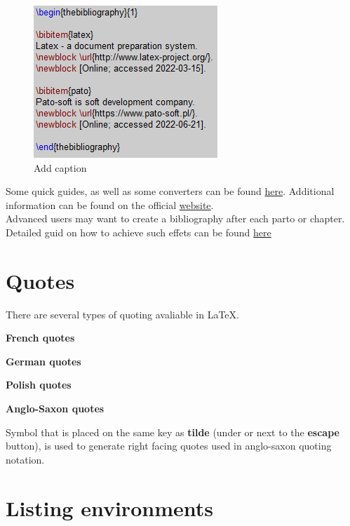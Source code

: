 \begin{figure}[H]
\centering
\includegraphics[scale=0.9]{content/LaTeX/figures/biblio_bbl.png}
\caption{Add caption}
\label{fig:printglossary} %
\end{figure}

Some quick guides, as well as some converters can be found \href{https://www.bibtex.com/g/bibtex-format/}{here}. Additional information can be found on the official \href{https://tug.org/bibtex/}{website}.\\

Advanced users may want to create a bibliography after each parto or chapter. Detailed guid on how to achieve such effets can be found \href{https://tex.stackexchange.com/questions/229846/different-bibliographies-for-each-chapter-with-shared-references}{here}

\section{Quotes}

There are several types of quoting avaliable in \LaTeX.

\textbf{French quotes}

\textbf{German quotes}

\textbf{Polish quotes}

\textbf{Anglo-Saxon quotes}

Symbol that is placed on the same key as \textbf{tilde} (under or next to the \textbf{escape} button), is used to generate right facing quotes used in anglo-saxon quoting notation.

\fbox{\textcolor{red}{FINISH THIS CHAPTER}}

\section{Listing environments}

\fbox{\textcolor{red}{FINISH THIS CHAPTER}}

